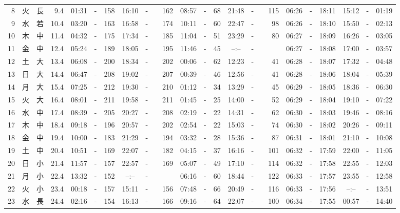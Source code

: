 \documentclass[12pt,a4j]{jsarticle}
\begin{document}
\begin{table}[htbp]
\begin{center}
{\begin{tabular}{|rc|cr|ccrccr|ccrccr|ccc|ccc|}
 8 & 火 & 長 &  9.4 &  01:31 &-& 158 &  16:10 &-& 162 &  08:57 &-&  68 &  21:48 &-& 115 & 06:26 & -& 18:11 & 15:12 & -& 01:19 \\
 9 & 水 & 若 & 10.4 &  03:20 &-& 163 &  16:58 &-& 174 &  10:11 &-&  60 &  22:47 &-&  98 & 06:26 & -& 18:10 & 15:50 & -& 02:13 \\
10 & 木 & 中 & 11.4 &  04:32 &-& 175 &  17:34 &-& 185 &  11:04 &-&  51 &  23:29 &-&  80 & 06:27 & -& 18:09 & 16:26 & -& 03:05 \\
11 & 金 & 中 & 12.4 &  05:24 &-& 189 &  18:05 &-& 195 &  11:46 &-&  45 &  --:-- &-&~~~~~ & 06:27 & -& 18:08 & 17:00 & -& 03:57 \\
12 & 土 & 大 & 13.4 &  06:08 &-& 200 &  18:34 &-& 202 &  00:06 &-&  62 &  12:23 &-&  41 & 06:28 & -& 18:07 & 17:32 & -& 04:48 \\
13 & 日 & 大 & 14.4 &  06:47 &-& 208 &  19:02 &-& 207 &  00:39 &-&  46 &  12:56 &-&  41 & 06:28 & -& 18:06 & 18:04 & -& 05:39 \\
14 & 月 & 大 & 15.4 &  07:25 &-& 212 &  19:30 &-& 210 &  01:12 &-&  34 &  13:29 &-&  45 & 06:29 & -& 18:05 & 18:36 & -& 06:30 \\
15 & 火 & 大 & 16.4 &  08:01 &-& 211 &  19:58 &-& 211 &  01:45 &-&  25 &  14:00 &-&  52 & 06:29 & -& 18:04 & 19:10 & -& 07:22 \\
16 & 水 & 中 & 17.4 &  08:39 &-& 205 &  20:27 &-& 208 &  02:19 &-&  22 &  14:31 &-&  62 & 06:30 & -& 18:03 & 19:46 & -& 08:16 \\
17 & 木 & 中 & 18.4 &  09:18 &-& 196 &  20:57 &-& 202 &  02:54 &-&  22 &  15:03 &-&  74 & 06:30 & -& 18:02 & 20:26 & -& 09:11 \\
18 & 金 & 中 & 19.4 &  10:00 &-& 183 &  21:29 &-& 194 &  03:32 &-&  28 &  15:36 &-&  87 & 06:31 & -& 18:01 & 21:10 & -& 10:08 \\
19 & 土 & 中 & 20.4 &  10:51 &-& 169 &  22:07 &-& 182 &  04:15 &-&  37 &  16:16 &-& 101 & 06:32 & -& 17:59 & 22:00 & -& 11:05 \\
20 & 日 & 小 & 21.4 &  11:57 &-& 157 &  22:57 &-& 169 &  05:07 &-&  49 &  17:10 &-& 114 & 06:32 & -& 17:58 & 22:55 & -& 12:03 \\
21 & 月 & 小 & 22.4 &  13:32 &-& 152 &  --:-- &-&~~~~~ &  06:16 &-&  60 &  18:44 &-& 122 & 06:33 & -& 17:57 & 23:55 & -& 12:58 \\
22 & 火 & 小 & 23.4 &  00:18 &-& 157 &  15:11 &-& 156 &  07:48 &-&  66 &  20:49 &-& 116 & 06:33 & -& 17:56 & --:-- & -& 13:51 \\
23 & 水 & 長 & 24.4 &  02:16 &-& 154 &  16:13 &-& 166 &  09:16 &-&  64 &  22:07 &-& 100 & 06:34 & -& 17:55 & 00:57 & -& 14:40 \\

\end{tabular}}
\end{center}
\end{table}
\end{document}

